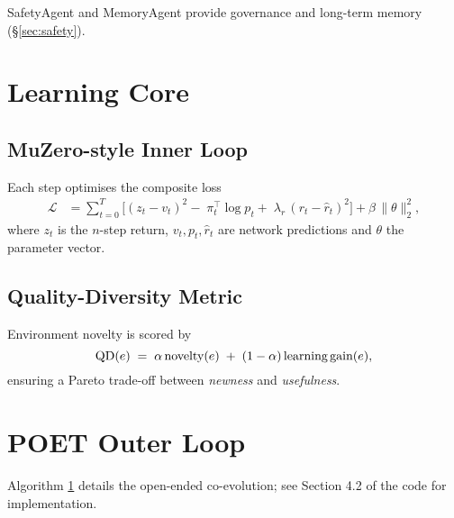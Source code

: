 \documentclass[11pt]{article}
\begin{document}
SafetyAgent and MemoryAgent provide governance and long-term memory (§\ref{sec:safety}).

\section{Learning Core}

\subsection{MuZero-style Inner Loop}

Each step optimises the composite loss
\begin{align}
\mathcal{L}
  &= \sum_{t=0}^{T}\!\bigl[(z_t - v_t)^2
      -\;\pi_t^{\!\top}\!\log p_t
      +\;\lambda_r\, (r_t - \hat r_t)^2 \bigr]
      + \beta\,\| \theta \|_2^2,
\end{align}
where \(z_t\) is the $n$-step return, \(v_t,p_t,\hat r_t\) are network
predictions and \(\theta\) the parameter vector.

\subsection{Quality-Diversity Metric}

Environment novelty is scored by
\[
\mathrm{QD}(e) \;=\;
\alpha\,\text{novelty}(e)
\;+\;
(1-\alpha)\,\text{learning\,gain}(e),
\]
ensuring a Pareto trade-off between \emph{newness} and \emph{usefulness}.

\section{POET Outer Loop}

Algorithm \ref{alg:poet} details the open-ended co-evolution; see
Section 4.2 of the code for implementation.

\begin{figure}[ht]\centering
{}
\label{alg:poet}\end{figure}
\end{document}
